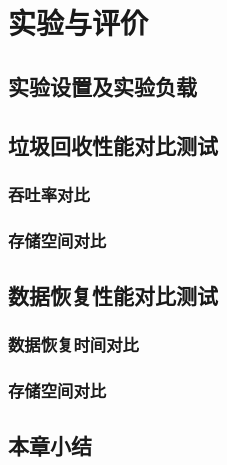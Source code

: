 
\chapter{实验与评价}

\section{实验设置及实验负载}

\section{垃圾回收性能对比测试}

\subsection{吞吐率对比}

\subsection{存储空间对比}

\section{数据恢复性能对比测试}

\subsection{数据恢复时间对比}

\subsection{存储空间对比}

\section{本章小结}

